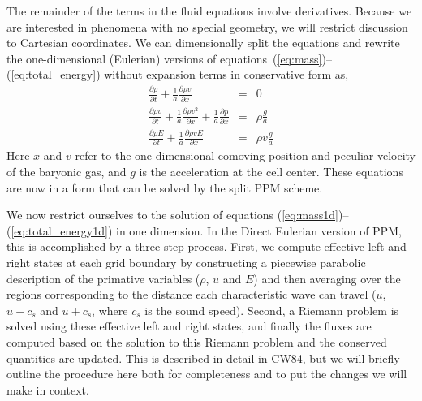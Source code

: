 The remainder of the terms in the fluid equations involve derivatives.
Because we are interested in phenomena with no special geometry, we
will restrict discussion to Cartesian coordinates.  We can
dimensionally split the equations and rewrite the one-dimensional
(Eulerian) versions of
equations~(\ref{eq:mass})--(\ref{eq:total_energy}) without expansion
terms in conservative form as,
\begin{eqnarray}
\frac{\partial \rho}{\partial t}  + \frac{1}{a} \frac{\partial \rho v }{\partial x}    & = &  
     0 \label{eq:mass1d} \\
\frac{\partial \rho v}{\partial t}  + \frac{1}{a} \frac{\partial \rho v^2}{\partial x}   + 
      \frac{1}{a} \frac{\partial p}{ \partial x} & = & 
      \rho \frac{g}{a}  \label{eq:momentum1d}  \\
\frac{\partial \rho E}{\partial t}  + \frac{1}{a} \frac{\partial \rho v E}{\partial x}  & =  &
      \rho v \frac{g}{a} \label{eq:total_energy1d}
\end{eqnarray}
%
Here $x$ and $v$ refer to the one dimensional comoving position and 
peculiar velocity of the baryonic gas, and $g$ is the acceleration at the cell center.
These equations are now in a form that can be solved by the split PPM scheme.


We now restrict ourselves to the solution of equations
(\ref{eq:mass1d})--(\ref{eq:total_energy1d}) in one dimension.  In the
Direct Eulerian version of PPM, this is accomplished by a three-step
process.  First, we compute effective left and right states at each
grid boundary by constructing a piecewise parabolic description of the
primative variables ($\rho$, $u$ and $E$) and then averaging over the
regions corresponding to the distance each characteristic wave can
travel ($u$, $u-c_s$ and $u+c_s$, where $c_s$ is the sound speed).
Second, a Riemann problem is solved using these effective left and
right states, and finally the fluxes are computed based on the
solution to this Riemann problem and the conserved quantities are
updated.  This is described in detail in CW84, but we will briefly
outline the procedure here both for completeness and to put the
changes we will make in context.

